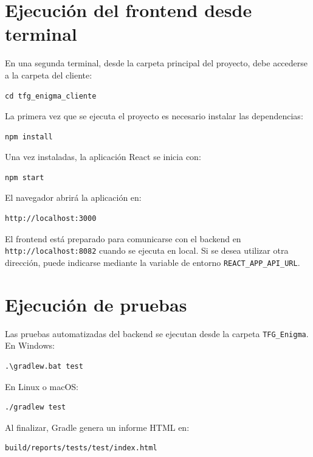 \section{Ejecución del frontend desde terminal}

En una segunda terminal, desde la carpeta principal del proyecto, debe accederse a la carpeta del cliente:

\begin{lstlisting}
cd tfg_enigma_cliente
\end{lstlisting}

La primera vez que se ejecuta el proyecto es necesario instalar las dependencias:

\begin{lstlisting}
npm install
\end{lstlisting}

Una vez instaladas, la aplicación React se inicia con:

\begin{lstlisting}
npm start
\end{lstlisting}

El navegador abrirá la aplicación en:

\begin{lstlisting}
http://localhost:3000
\end{lstlisting}

El frontend está preparado para comunicarse con el backend en \texttt{http://localhost:8082} cuando se ejecuta en local. Si se desea utilizar otra dirección, puede indicarse mediante la variable de entorno \texttt{REACT\_APP\_API\_URL}.

\section{Ejecución de pruebas}

Las pruebas automatizadas del backend se ejecutan desde la carpeta \texttt{TFG\_Enigma}. En Windows:

\begin{lstlisting}
.\gradlew.bat test
\end{lstlisting}

En Linux o macOS:

\begin{lstlisting}
./gradlew test
\end{lstlisting}

Al finalizar, Gradle genera un informe HTML en:

\begin{lstlisting}
build/reports/tests/test/index.html
\end{lstlisting}

